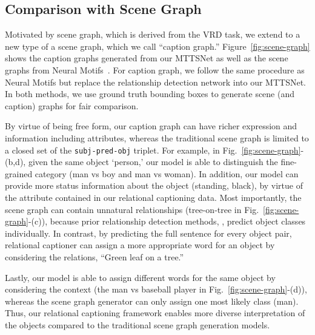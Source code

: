 \documentclass[10pt,twocolumn,letterpaper]{article}
\begin{document}
\subsection{Comparison with Scene Graph}
{
Motivated by scene graph, which is derived from the VRD task,
we extend to a new type of a scene graph, which we call ``caption graph.'' 
Figure~\ref{fig:scene-graph} shows the caption graphs generated from our MTTSNet as well as the scene graphs from Neural Motifs~\cite{zellers2018neural}.
{For caption graph, we follow the same procedure as Neural Motifs but replace the relationship detection network into our MTTSNet.}
In both methods, we use ground truth bounding boxes {to generate scene (and caption) graphs} for fair comparison.

By virtue of being free form, our caption graph can have richer expression and information including attributes, whereas the traditional scene graph is limited to a closed set of the \texttt{subj-pred-obj} triplet.
For example, in Fig.~\ref{fig:scene-graph}-(b,d), given the same object `person,' our model is able to distinguish the fine-grained category (\ie man vs boy and man vs woman).
In addition, our model can provide more status information about the object (\eg standing, black), by virtue of the attribute contained in our relational captioning data.
Most importantly, the scene graph can contain unnatural relationships (\eg tree-on-tree in Fig.~\ref{fig:scene-graph}-(c)), because prior relationship detection methods, \eg \cite{zellers2018neural}, predict object classes individually.
In contrast, by predicting the full sentence for every object pair, relational captioner can assign a more appropriate word for an object by considering the relations, \eg ``Green leaf on a tree.''

Lastly, our model is able to assign different words for the same object by considering the context (the man vs baseball player in Fig.~\ref{fig:scene-graph}-(d)), whereas the scene graph generator can only assign one most likely class (man).
Thus, our relational captioning framework enables more diverse interpretation of the objects compared to the traditional scene graph generation models.
}
\end{document}
